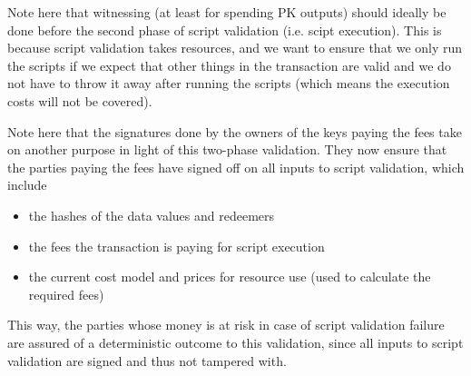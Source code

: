 Note here that witnessing (at least for spending PK outputs) should ideally
be done before the second phase of script validation (i.e. scipt execution).
This is because script validation takes resources, and we want to ensure
that we only run the scripts if we expect that other things in the transaction are
valid and we do not have to throw it away after running the scripts (which means
the execution costs will not be covered).

Note here that the signatures done by the owners of the keys paying the fees
take on another purpose in light of this two-phase validation.
They now ensure that the parties paying the fees have signed off on all
inputs to script validation, which include

\begin{itemize}
  \item the hashes of the data values and redeemers
  \item the fees the transaction is paying for script execution
  \item the current cost model and prices for resource use (used to calculate
  the required fees)
\end{itemize}

This way, the parties whose money is at risk in case of script validation
failure are assured of a deterministic outcome to this validation, since
all inputs to script validation are signed and thus not tampered with.


